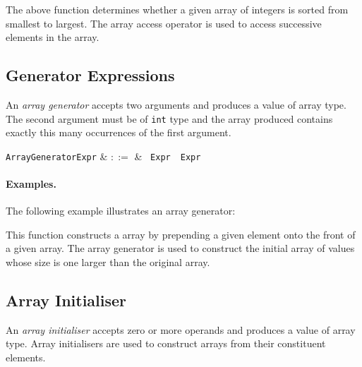 

The above function determines whether a given array of integers is sorted from smallest to largest.  The array access operator is used to access successive elements in the array. 


\subsection{Generator Expressions}
\label{c_expr_generator}

An {\em array generator} accepts two arguments and produces a value of array type.  The second argument must be of \lstinline{int} type and the array produced contains exactly this many occurrences of the first argument.

\begin{syntax}
  \verb+ArrayGeneratorExpr+ & $::=$ & \token{[}\ \verb+Expr+\ \token{;}\ \verb+Expr+\ \token{]}\\
\end{syntax}

\paragraph{Examples.} The following example illustrates an array generator:



This function constructs a array by prepending a given element onto the front of a given array.  The array generator is used to construct the initial array of values whose size is one larger than the original array.


\subsection{Array Initialiser}
\label{c_expr_array_initialiser}
An {\em array initialiser} accepts zero or more operands and produces a value of array type.  Array initialisers are used to construct arrays from their constituent elements.  

